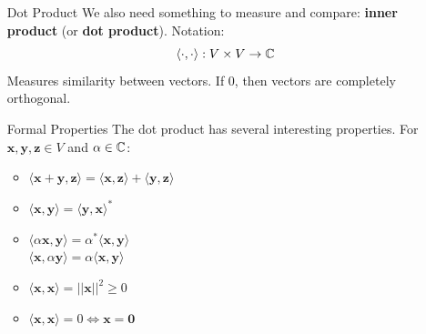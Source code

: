 \documentclass[11pt,a4paper]{article}
\begin{document}
\begin{itemize}
        \begin{multicols}{2}
            \begin{itemize}[font=\normalfont, nolistsep]
                \item $\mathbf{x}+\mathbf{y} = \mathbf{y}+\mathbf{x}$
                \item $(\mathbf{x}+\mathbf{y}) + \mathbf{z} = \mathbf{x}+(\mathbf{x}+\mathbf{y})$
                \item $\alpha(\mathbf{x}+\mathbf{y}) = \alpha\mathbf{x} + \alpha\mathbf{y}$
                \item $(\alpha+ \beta)\mathbf{x} = \alpha\mathbf{x} + \beta\mathbf{x}$
                \item $\alpha(\beta\mathbf{x}) = (\alpha\beta)\mathbf{x}$
                \item $\exists 0 \in V | \mathbf{x} + 0 = 0+\mathbf{x} = \mathbf{x}$
                \item $\forall \mathbf{x} \in V \exists(-\mathbf{x}) | x+(- \mathbf{x}) = 0$
            \end{itemize}
        \end{multicols}
    \item[Dot Product]We also need something to measure and compare: \textbf{inner product} (or \textbf{dot product}). Notation: 
        \[ \langle\cdot,\cdot\rangle : V\times V \to \mathbb{C} \]
        Measures similarity between vectors. If 0, then vectors are completely orthogonal.
    \item[Formal Properties]The dot product has several interesting properties. For $\mathbf{x},\mathbf{y},\mathbf{z} \in V$ and $\alpha\in\mathbb{C}$:
    \begin{multicols}{2}
        \begin{itemize}
            \item $\langle\mathbf{x}+\mathbf{y},\mathbf{z}\rangle = \langle\mathbf{x},\mathbf{z}\rangle + \langle\mathbf{y},\mathbf{z}\rangle$
            \item $\langle\mathbf{x},\mathbf{y}\rangle = \langle\mathbf{y},\mathbf{x}\rangle^*$
            \item $\langle\alpha\mathbf{x},\mathbf{y}\rangle = \alpha^*\langle\mathbf{x},\mathbf{y}\rangle$\\
            $\langle\mathbf{x},\alpha\mathbf{y}\rangle = \alpha\langle\mathbf{x},\mathbf{y}\rangle$
            \item $\langle\mathbf{x},\mathbf{x}\rangle = ||\mathbf{x}||^2 \geq 0$
            \item $\langle\mathbf{x},\mathbf{x}\rangle = 0 \iff \mathbf{x} = \mathbf{0}$

\end{itemize}
\end{multicols}
\end{itemize}
\end{document}
